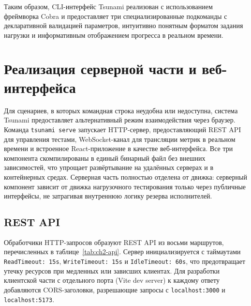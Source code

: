 Таким образом, CLI-интерфейс Tsunami реализован с использованием фреймворка Cobra и предоставляет три специализированные подкоманды с декларативной валидацией параметров, интуитивно понятным форматом задания нагрузки и информативным отображением прогресса в реальном времени.


\section{Реализация серверной части и веб-интерфейса}

Для сценариев, в которых командная строка неудобна или недоступна, система Tsunami предоставляет альтернативный режим взаимодействия через браузер.
Команда \texttt{tsunami serve} запускает HTTP-сервер, предоставляющий REST API для управления тестами, WebSocket-канал для трансляции метрик в реальном времени и встроенное React-приложение в качестве веб-интерфейса.
Все три компонента скомпилированы в единый бинарный файл без внешних зависимостей, что упрощает развёртывание на удалённых серверах и в контейнерных средах.
Серверная часть полностью отделена от движка: серверный компонент зависит от движка нагрузочного тестирования только через публичные интерфейсы, не затрагивая внутреннюю логику резерва исполнителей.

\subsection*{REST API}

Обработчики HTTP-запросов образуют REST API из восьми маршрутов, перечисленных в таблице~\ref{tab:ch2-api}.
Сервер инициализируется с таймаутами \texttt{ReadTimeout: 15s}, \texttt{WriteTimeout: 15s} и \texttt{IdleTimeout: 60s}, что предотвращает утечку ресурсов при медленных или зависших клиентах.
Для разработки клиентской части с отдельного порта (Vite dev server) к каждому ответу добавляются CORS-заголовки, разрешающие запросы с \texttt{localhost:3000} и \texttt{localhost:5173}.

